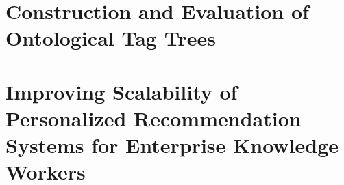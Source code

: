 \documentclass[12pt]{ucsddissertation}
\begin{document}
\chapter{Construction and Evaluation of Ontological Tag Trees}



\chapter{Improving Scalability of Personalized Recommendation Systems for Enterprise Knowledge Workers}



\backmatter

\end{document}
